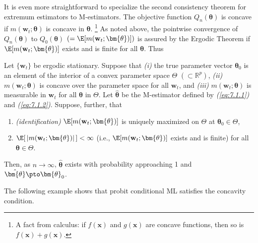 It is even more straightforward to specialize the second consistency theorem for extremum estimators to M-estimators. The objective function $Q_n(\bm{\theta})$ is concave if $m(\mathbf{w}_t; \bm{\theta})$ is concave in $\bm{\theta}$.%
\footnote{A fact from calculus: if $f(\mathbf{x})$ and $g(\mathbf{x})$ are concave functions, then so is $f(\mathbf{x}) + g(\mathbf{x})$.}
As noted above, the pointwise convergence of $Q_n(\bm{\theta})$ to $Q_0(\bm{\theta})$ $(= \E[m(\mathbf{w}_t; \bm{\theta})])$ is assured by the Ergodic Theorem if $\E[m(\mathbf{w}_t; \bm{\theta})]$ exists and is finite for all $\bm{\theta}$. Thus

\begin{proposition}
\label{prop:7.4}
Let $\{\mathbf{w}_t\}$ be ergodic stationary. Suppose that \emph{(i)} the true parameter vector $\bm{\theta}_0$ is an element of the interior of a convex parameter space $\Theta$ $(\subset \mathbb{R}^p)$, \emph{(ii)} $m(\mathbf{w}_t; \bm{\theta})$ is concave over the parameter space for all $\mathbf{w}_t$, and \emph{(iii)} $m(\mathbf{w}_t; \bm{\theta})$ is measurable in $\mathbf{w}_t$ for all $\bm{\theta}$ in $\Theta$. Let $\hat{\bm{\theta}}$ be the M-estimator defined by \emph{(\ref{eq:7.1.1})} and \emph{(\ref{eq:7.1.2})}. Suppose, further, that
\begin{enumerate}[label=(\alph*)]
\item \emph{(identification)} \enspace $\E[m(\mathbf{w}_t; \bm{\theta})]$ is uniquely maximized on $\Theta$ at $\bm{\theta}_0 \in \Theta$,
\item $\E[\,|m(\mathbf{w}_t; \bm{\theta})|\,] < \infty$ (i.e., $\E[m(\mathbf{w}_t; \bm{\theta})]$ exists and is finite) for all $\bm{\theta} \in \Theta$.
\end{enumerate}
Then, as $n \to \infty$, $\hat{\bm{\theta}}$ exists with probability approaching 1 and $\hat{\bm{\theta}} \pto \bm{\theta}_0$.
\end{proposition}

The following example shows that probit conditional ML satisfies the concavity condition.


